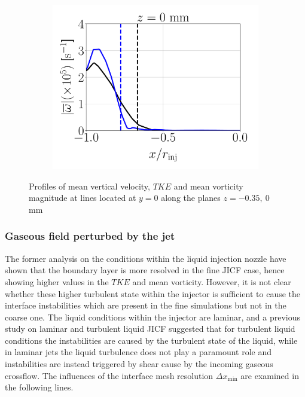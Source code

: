 \begin{figure}[ht]
\begin{subfigure}[b]{0.3\textwidth}
	\flushleft
   \includegraphics[scale=0.225]{./part2_developments/figures_ch5_resolved_JICF/instabilities_resolution/line_data_injector_vort_z0p00}
\end{subfigure}

   \caption{Profiles of mean vertical velocity, $TKE$ and mean vorticity magnitude at lines located at $y = 0$ along the planes $z = -0.35,~0$ mm}
\label{fig:jicf_data_lines_inside_injector}
\end{figure}


\subsubsection*{Gaseous field perturbed by the jet}


The former analysis on the conditions within the liquid injection nozzle have shown that the boundary layer is more resolved in the fine JICF case, hence showing higher values in the $TKE$ and mean vorticity. However, it is not clear whether these higher turbulent state within the injector is sufficient to cause the interface instabilities which are present in the fine simulations but not in the coarse one. The liquid conditions within the injector are laminar, and a previous study on laminar and turbulent liquid JICF  suggested that for turbulent liquid conditions the instabilities are caused by the turbulent state of the liquid, while in laminar jets the liquid turbulence does not play a paramount role and instabilities are instead triggered by shear cause by the incoming gaseous crossflow. The influences of the interface mesh resolution $\Delta x_\mathrm{min}$ are examined in the following lines.



